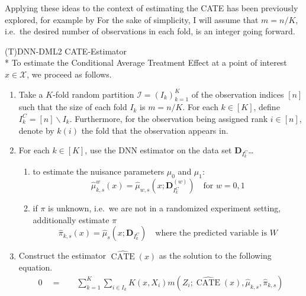 Applying these ideas to the context of estimating the CATE has been previously explored, for example by \citet{semenova_debiased_2021}
For the sake of simplicity, I will assume that $m = n/K$, i.e.\ the desired number of observations in each fold, is an integer going forward.
\begin{boxD}
	\begin{dfn}{(T)DNN-DML2 CATE-Estimator}\label{def:CATE_DNN_DML}\mbox{}\\*
		To estimate the Conditional Average Treatment Effect at a point of interest $x \in \mathcal{X}$, we proceed as follows.
		\begin{enumerate}
			\item Take a $K$-fold random partition $\mathcal{I} = \left(I_k\right)_{k = 1}^{K}$
			      of the observation indices $[n]$ such that the size of each fold $I_k$ is $m =
				      n/K$. For each $k \in [K]$, define $I_{k}^{C} = [n] \backslash I_k$.
			      Furthermore, for the observation being assigned rank $i \in [n]$, denote by
			      $k(i)$ the fold that the observation appears in.
			\item For each $k \in [K]$, use the DNN estimator on the data set
			      $\mathbf{D}_{I_k^C}$\dots
			      \begin{enumerate}
				      \item to estimate the nuisance parameters $\mu_0$ and $\mu_1$:
				            \begin{equation}
					            \hat{\mu}_{k,s}^{w}\left(x\right) = \hat{\mu}_{w,s}\left(x; \mathbf{D}_{I_k^{C}}^{(w)}\right) \quad \text{for } w=0,1
				            \end{equation}
				      \item if $\pi$ is unknown, i.e.\ we are not in a randomized experiment setting,
				            additionally estimate $\pi$
				            \begin{equation}
					            \hat{\pi}_{k,s}\left(x\right) = \hat{\mu}_{s}\left(x; \mathbf{D}_{I_k^{C}}\right) \quad \text{where the predicted variable is $W$}
				            \end{equation}
			      \end{enumerate}
			\item Construct the estimator $\widehat{\operatorname{CATE}}\left(x\right)$
			      as the solution to the following equation.
			      \begin{equation}
				      \begin{aligned}
					      0 \quad = \quad & \sum_{k = 1}^{K} \sum_{i \in I_k} K(x, X_{i}) m\left(Z_{i}; \widehat{\operatorname{CATE}}\left(x\right), \hat{\mu}_{k,s}, \hat{\pi}_{k,s}\right)                                                                \\

\end{aligned}
\end{equation}
\end{enumerate}
\end{dfn}
\end{boxD}
